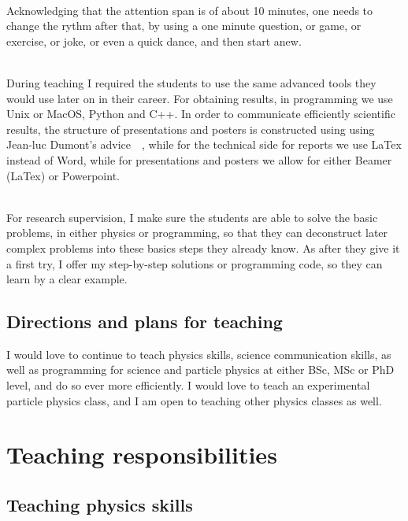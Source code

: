 \documentclass[12pt]{article} %
\begin{document}
\ \\Acknowledging that the attention span is of about 10 minutes, one needs to change the rythm after that, by using a one minute question, or game, or exercise, or joke, or even a quick dance, and then start anew. 

\ \\During teaching I required the students to use the same advanced tools they would use later on in their career. For obtaining results, in programming we use Unix or MacOS, Python and C++. In order to communicate efficiently scientific results, the structure of presentations and posters is constructed using using Jean-luc Dumont's advice~\cite{JeanLucDumontVideo}~\cite{JeanLucDumontBook}, while for the technical side for reports we use LaTex instead of Word, while for presentations and posters we allow for either Beamer (LaTex) or Powerpoint. 

\ \\For research supervision, I make sure the students are able to solve the basic problems, in either physics or programming, so that they can deconstruct later complex problems into these basics steps they already know. As after they give it a first try, I offer my step-by-step solutions or programming code, so they can learn by a clear example. 


\subsection{Directions and plans for teaching}

I would love to continue to teach physics skills, science communication skills, as well as programming for science and particle physics at either BSc, MSc or PhD level, and do so ever more efficiently. I would love to teach an experimental particle physics class, and I am open to teaching other physics classes as well. 

\section{Teaching responsibilities} %

\subsection{Teaching physics skills}
\end{document}
